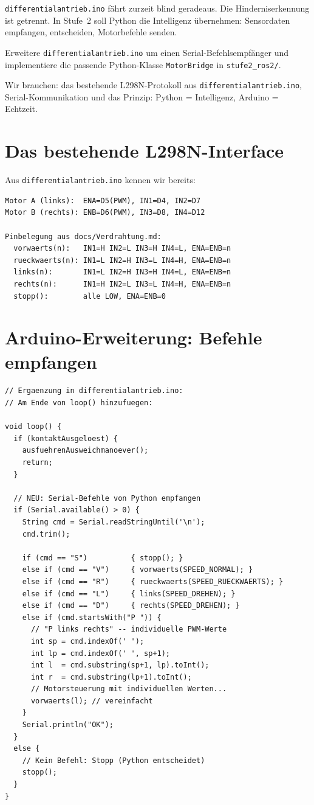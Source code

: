 \texttt{differentialantrieb.ino} fährt zurzeit blind
geradeaus. Die Hinderniserkennung ist getrennt.
In Stufe~2 soll Python die Intelligenz übernehmen:
Sensordaten empfangen, entscheiden, Motorbefehle senden.

\begin{aufgabeBox}
Erweitere \texttt{differentialantrieb.ino} um einen
Serial-Befehlsempfänger und implementiere die passende
Python-Klasse \texttt{MotorBridge} in \texttt{stufe2\_ros2/}.
\end{aufgabeBox}

\begin{wissenBox}
Wir brauchen: das bestehende L298N-Protokoll aus
\texttt{differentialantrieb.ino}, Serial-Kommunikation
und das Prinzip: Python = Intelligenz, Arduino = Echtzeit.
\end{wissenBox}

\section{Das bestehende L298N-Interface}

Aus \texttt{differentialantrieb.ino} kennen wir bereits:

\begin{lstlisting}[style=text]
Motor A (links):  ENA=D5(PWM), IN1=D4, IN2=D7
Motor B (rechts): ENB=D6(PWM), IN3=D8, IN4=D12

Pinbelegung aus docs/Verdrahtung.md:
  vorwaerts(n):   IN1=H IN2=L IN3=H IN4=L, ENA=ENB=n
  rueckwaerts(n): IN1=L IN2=H IN3=L IN4=H, ENA=ENB=n
  links(n):       IN1=L IN2=H IN3=H IN4=L, ENA=ENB=n
  rechts(n):      IN1=H IN2=L IN3=L IN4=H, ENA=ENB=n
  stopp():        alle LOW, ENA=ENB=0
\end{lstlisting}

\section{Arduino-Erweiterung: Befehle empfangen}

\begin{lstlisting}[style=text]
// Ergaenzung in differentialantrieb.ino:
// Am Ende von loop() hinzufuegen:

void loop() {
  if (kontaktAusgeloest) {
    ausfuehrenAusweichmanoever();
    return;
  }

  // NEU: Serial-Befehle von Python empfangen
  if (Serial.available() > 0) {
    String cmd = Serial.readStringUntil('\n');
    cmd.trim();

    if (cmd == "S")          { stopp(); }
    else if (cmd == "V")     { vorwaerts(SPEED_NORMAL); }
    else if (cmd == "R")     { rueckwaerts(SPEED_RUECKWAERTS); }
    else if (cmd == "L")     { links(SPEED_DREHEN); }
    else if (cmd == "D")     { rechts(SPEED_DREHEN); }
    else if (cmd.startsWith("P ")) {
      // "P links rechts" -- individuelle PWM-Werte
      int sp = cmd.indexOf(' ');
      int lp = cmd.indexOf(' ', sp+1);
      int l  = cmd.substring(sp+1, lp).toInt();
      int r  = cmd.substring(lp+1).toInt();
      // Motorsteuerung mit individuellen Werten...
      vorwaerts(l); // vereinfacht
    }
    Serial.println("OK");
  }
  else {
    // Kein Befehl: Stopp (Python entscheidet)
    stopp();
  }
}
\end{lstlisting}

